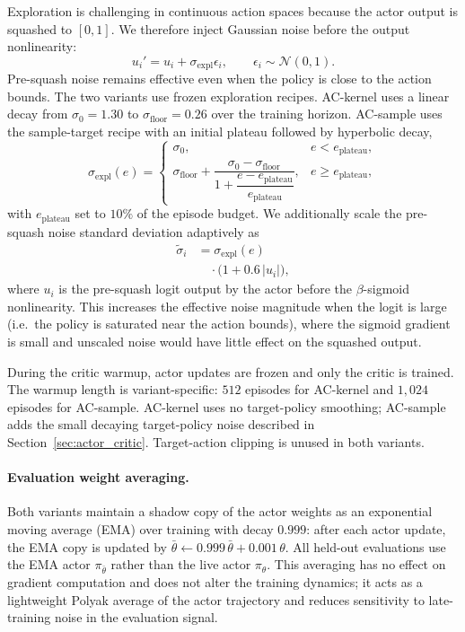 \documentclass[a4paper,fleqn]{cas-dc}
\begin{document}
Exploration is challenging in continuous action spaces because the actor output is squashed to $[0,1]$. We therefore inject Gaussian noise before the output nonlinearity:
\[
    u_i' = u_i + \sigma_{\mathrm{expl}} \epsilon_i,
    \qquad
    \epsilon_i \sim \mathcal{N}(0,1).
\]
Pre-squash noise remains effective even when the policy is close to the action bounds. The two variants use frozen exploration recipes. AC-kernel uses a linear decay from $\sigma_0=1.30$ to $\sigma_{\mathrm{floor}}=0.26$ over the training horizon. AC-sample uses the sample-target recipe with an initial plateau followed by hyperbolic decay,
\[
    \sigma_{\mathrm{expl}}(e) =
    \begin{cases}
        \sigma_0, & e < e_{\mathrm{plateau}},   \\[0.3em]
        \sigma_{\mathrm{floor}} +
        \dfrac{\sigma_0 - \sigma_{\mathrm{floor}}}
        {1 + \dfrac{e-e_{\mathrm{plateau}}}{e_{\mathrm{plateau}}}},
                  & e \ge e_{\mathrm{plateau}},
    \end{cases}
\]
with $e_{\mathrm{plateau}}$ set to $10\%$ of the episode budget.
We additionally scale the pre-squash noise standard deviation adaptively as
\[
    \begin{aligned}
        \tilde\sigma_i
         & = \sigma_{\mathrm{expl}}(e)             \\
         & \quad \cdot \bigl(1 + 0.6\,|u_i|\bigr),
    \end{aligned}
\]
where $u_i$ is the pre-squash logit output by the actor before the $\beta$-sigmoid nonlinearity.
This increases the effective noise magnitude when the logit is large (i.e.\ the policy is saturated near the action bounds), where the sigmoid gradient is small and unscaled noise would have little effect on the squashed output.

During the critic warmup, actor updates are frozen and only the critic is trained. The warmup length is variant-specific: $512$ episodes for AC-kernel and $1{,}024$ episodes for AC-sample. AC-kernel uses no target-policy smoothing; AC-sample adds the small decaying target-policy noise described in Section~\ref{sec:actor_critic}. Target-action clipping is unused in both variants.

\paragraph{Evaluation weight averaging.}
Both variants maintain a shadow copy of the actor weights as an exponential moving average (EMA) over training with decay $0.999$: after each actor update, the EMA copy is updated by $\bar\theta \leftarrow 0.999\,\bar\theta + 0.001\,\theta$. All held-out evaluations use the EMA actor $\pi_{\bar\theta}$ rather than the live actor $\pi_\theta$. This averaging has no effect on gradient computation and does not alter the training dynamics; it acts as a lightweight Polyak average of the actor trajectory and reduces sensitivity to late-training noise in the evaluation signal.
\end{document}
